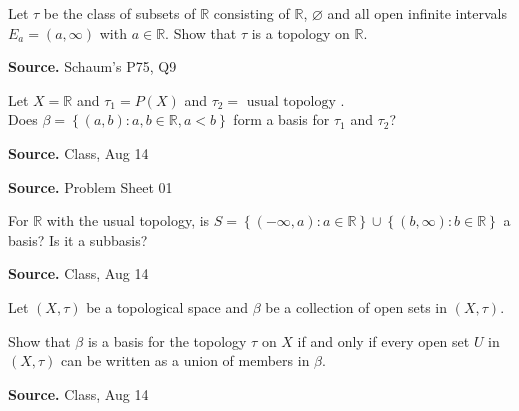 \documentclass[12pt,twoside]{report}
\newenvironment*{source}{\hfill\scriptsize\textbf{Source.}\space}{\par}
\begin{document}
\begin{samepage}
\begin{ex}
Let $\tau$ be the class of subsets of $\mathbb{R}$ consisting of $\mathbb{R}$, $\varnothing$ and all open infinite intervals $E_a = \left (a, \infty\right )$ with $a \in \mathbb{R}$.
Show that $\tau$ is a topology on $\mathbb{R}$.
\end{ex}
\begin{source}
Schaum's P75, Q9
\end{source}
\end{samepage}

\begin{samepage}
\begin{ex}
    Let $X = \mathbb{R}$ and $\tau_1 = P\left (X\right )$ and $\tau_2 = \text{ usual topology }$. \\
    Does $\beta = \left\{ \left (a,b\right )  :  a,b \in \mathbb{R}, a < b \right\}$ form a basis for $\tau_1$ and $\tau_2$?
\end{ex}
\begin{source}
    Class, Aug 14
\end{source}
\end{samepage}

\begin{samepage}
\begin{ex}
\end{ex}
\begin{source}
Problem Sheet 01
\end{source}
\end{samepage}

\begin{samepage}
\begin{ex}
    For $\mathbb{R}$ with the usual topology, is $S = \left\{ \left (- \infty, a\right )  :  a \in \mathbb{R} \right\} \cup \left\{ \left (b, \infty\right )  :  b \in \mathbb{R} \right\}$ a basis? Is it a subbasis?
\end{ex}
\begin{source}
Class, Aug 14
\end{source}
\end{samepage}

\begin{samepage}
\begin{ex}
Let $\left (X, \tau\right )$ be a topological space and $\beta$ be a collection of open sets in $\left (X, \tau\right )$. 

Show that $\beta$ is a basis for the topology $\tau$ on $X$ if and only if every open set $U$ in $\left (X, \tau\right )$ can be written as a union of members in $\beta$.
\end{ex}
\begin{source}
Class, Aug 14
\end{source}
\end{samepage}
\end{document}
